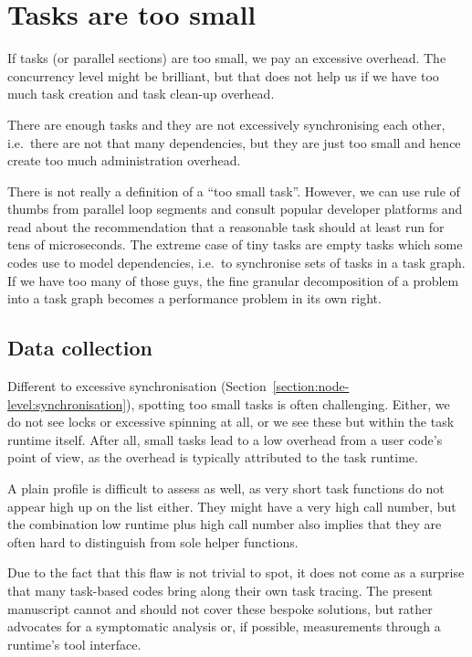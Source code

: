 \section{Tasks are too small}
\label{section:node-level:tasks-too-small}


If tasks (or parallel sections) are too small, we pay an excessive overhead.
The concurrency level might be brilliant, but that does not help us if we have too much task creation and task clean-up overhead.

\begin{hypothesis}
 There are enough tasks and they are not excessively synchronising each other, i.e.~there are not that many dependencies, but they are just too small and hence create too much administration overhead.
\end{hypothesis}


There is not really a definition of a ``too small task''.
However, we can use rule of thumbs from parallel loop segments and consult popular developer platforms and read about the recommendation that a reasonable task should at least run for tens of microseconds.
The extreme case of tiny tasks are empty tasks which some codes use to model dependencies, i.e.~to synchronise sets of tasks in a task graph.
If we have too many of those guys, the fine granular decomposition of a problem into a task graph becomes a performance problem in its own right.


\subsection{Data collection}

Different to excessive synchronisation (Section~\ref{section:node-level:synchronisation}), spotting too small tasks is often challenging.
Either, we do not see locks or excessive spinning at all, or we see these but within the task runtime itself.
After all, small tasks lead to a low overhead from a user code's point of view, as the overhead is typically attributed to the task runtime.

A plain profile is difficult to assess as well, as very short task functions do not appear high up on the list either.
They might have a very high call number, but the combination low runtime plus high call number also implies that they are often hard to distinguish from sole helper functions.

Due to the fact that this flaw is not trivial to spot, it does not come as a surprise that many task-based codes bring along their own task tracing.
The present manuscript cannot and should not cover these bespoke solutions, but rather advocates for a symptomatic analysis or, if possible, measurements through a runtime's tool interface.


